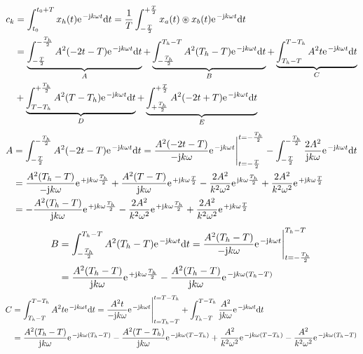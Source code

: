 \documentclass[11pt,a4paper,DIV=12]{scrartcl}
\newcommand{\diff}{\mathrm{d}}
\begin{document}
%
%
%
\begin{align}
	c_k&=\int_{t_0}^{t_0+T}x_{h}(t)\e^{-\im k \omega t}\diff t=\frac{1}{T}\int_{-\frac{T}{2}}^{+\frac{T}{2}}x_{a}(t)\circledast x_{b}(t)\e^{-\im k \omega t}\diff t\nonumber \\
	&=\underbrace{\int_{-\frac{T}{2}}^{-\frac{T_h}{2}}A^2(-2t-T)\e^{-\im k \omega t}\diff t}_A+\underbrace{\int_{-\frac{T_h}{2}}^{T_h-T}A^2(T_h-T)\e^{-\im k \omega t}\diff t}_B+\underbrace{\int_{T_h-T}^{T-T_h}A^2t\e^{-\im k \omega t}\diff t}_C\nonumber \\
	&+\underbrace{\int_{T-T_h}^{+\frac{T_h}{2}}A^2(T-T_h)\e^{-\im k \omega t}\diff t}_D+\underbrace{\int_{+\frac{T_h}{2}}^{+\frac{T}{2}}A^2(-2t+T)\e^{-\im k \omega t}\diff t}_E
\end{align}
%
%
%
\begin{align}
	A&=\int_{-\frac{T}{2}}^{-\frac{T_h}{2}}A^2(-2t-T)\e^{-\im k \omega t}\diff t=\frac{A^2(-2t-T)}{-\im k \omega}\e^{-\im k \omega t}\Bigg |_{t=-\frac{T}{2}}^{t=-\frac{T_h}{2}}-\int_{-\frac{T}{2}}^{-\frac{T_h}{2}}\frac{2A^2}{\im k \omega}\e^{-\im k \omega t}\diff t\nonumber \\
	&=\frac{A^2(T_h-T)}{-\im k \omega}\e^{+\im k \omega \frac{T_h}{2}}+\frac{A^2(T-T)}{\im k \omega}\e^{+\im k \omega \frac{T}{2}}-\frac{2A^2}{k^2\omega^2}\e^{\im k \omega \frac{T_h}{2}}+\frac{2A^2}{k^2\omega^2}\e^{+\im k \omega \frac{T}{2}}\nonumber \\
	&=-\frac{A^2(T_h-T)}{\im k \omega}\e^{+\im k \omega \frac{T_h}{2}}-\frac{2A^2}{k^2\omega^2}\e^{+\im k \omega \frac{T_h}{2}}+\frac{2A^2}{k^2\omega^2}\e^{+\im k \omega \frac{T}{2}}
\end{align}
%
%
%
\begin{align}
	B&=\int_{-\frac{T_h}{2}}^{T_h-T}A^2(T_h-T)\e^{-\im k \omega t}\diff t = \frac{A^2(T_h-T)}{-\im k \omega}\e^{-\im k \omega t}\Bigg |_{t=-\frac{T_h}{2}}^{T_h-T}\nonumber \\
	&=\frac{A^2(T_h-T)}{\im k \omega}\e^{+\im k \omega \frac{T_h}{2}}-\frac{A^2(T_h-T)}{\im k \omega}\e^{-\im k \omega (T_h-T)}
\end{align}
%
%
%
\begin{align}
	C&=\int_{T_h-T}^{T-T_h}A^2t\e^{-\im k \omega t}\diff t=\frac{A^2t}{-\im k \omega }\e^{-\im k \omega t}\Bigg |_{t=T_h-T}^{t=T-T_h}+\int_{T_h-T}^{T-T_h}\frac{A^2}{\im k \omega}\e^{-\im k \omega t}\diff t\nonumber \\
	&=\frac{A^2(T_h-T)}{\im k \omega}\e^{-\im k \omega (T_h-T)}-\frac{A^2(T-T_h)}{\im k \omega}\e^{-\im k \omega (T-T_h)}+\frac{A^2}{k^2\omega^2}\e^{-\im k \omega (T-T_h)}-\frac{A^2}{k^2\omega^2}\e^{-\im k \omega (T_h-T)}
\end{align}
\end{document}
